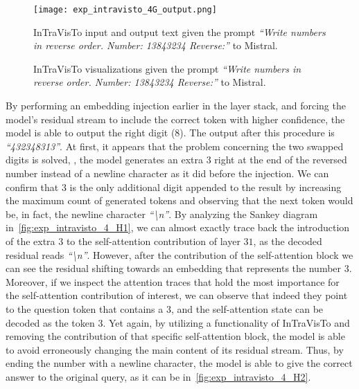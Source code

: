 \begin{figure}[tp!]
    \centering
    \texttt{[image: exp\_intravisto\_4G\_output.png]}
    \caption{InTraVisTo input and output text given the prompt \emph{``Write numbers in reverse order. Number: 13843234 Reverse:''} to Mistral.}
    \label{fig:exp_intravisto_4_G1}
\end{figure}

\begin{figure}[tp!]
    \centering
    \quad
    \caption{InTraVisTo visualizations given the prompt \emph{``Write numbers in reverse order. Number: 13843234 Reverse:''} to Mistral.}
    \label{fig:exp_intravisto_4_G}
\end{figure}

By performing an embedding injection earlier in the layer stack, and forcing the model's residual stream to include the correct token with higher confidence, the model is  able to output the right digit ($8$).
The output after this procedure is \emph{``432348313''}.
At first, it appears that the problem concerning the two swapped digits is solved, , the model generates an extra $3$ right at the end of the reversed number instead of a newline character as it did before the injection.
We can confirm that $3$ is the only additional digit appended to the result by increasing the maximum count of generated tokens and observing that the next token would be, in fact, the newline character \emph{``\textbackslash{}n''}.
By analyzing the Sankey diagram in~\cref{fig:exp_intravisto_4_H1}, we can almost exactly trace back the introduction of the extra $3$ to the self-attention contribution of layer $31$, as  the decoded residual reads \emph{``\textbackslash{}n''}.
However, after the contribution of the  self-attention block we can see the residual shifting towards an embedding that represents the number $3$.
Moreover, if we inspect the attention traces that hold the most importance for the self-attention contribution of interest, we can observe that indeed they point to the question token that contains a $3$, and the self-attention state  can be decoded as the token $3$.
Yet again, by utilizing a functionality of InTraVisTo and removing the contribution of that specific self-attention block, the model is able to avoid erroneously changing the main content of its residual stream.
Thus, by ending the number with a newline character, the model is able to give the correct answer to the original query, as it can be  in~\cref{fig:exp_intravisto_4_H2}.

